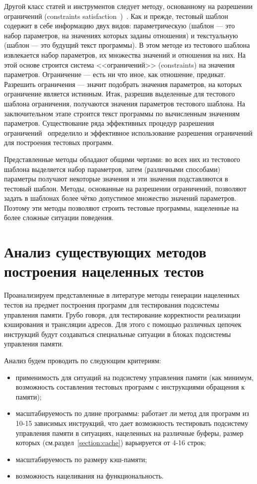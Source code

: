 
Другой класс статей и инструментов следует методу, основанному на разрешении ограничений (constraints satisfaction~\cite{CLPusingECLiPSe})~\cite{GenesysPro, GenesysPro2004Innovations, DeepTrans, RAVEN, MAATG}. Как и прежде, тестовый шаблон содержит в себе информацию двух видов: параметрическую (шаблон --- это набор параметров, на значениях которых заданы отношения) и текстуальную (шаблон --- это будущий текст программы). В этом методе из тестового шаблона извлекается набор параметров, их множества значений и отношения на них. На этой основе строится система <<ограничений>> (constraints) на значения параметров. Ограничение --- есть ни что иное, как отношение, предикат. Разрешить ограничения --- значит подобрать значения параметров, на которых ограничение является истинным. Итак, разрешив выделенные для тестового шаблона ограничения, получаются значения параметров тестового шаблона. На заключительном этапе строится текст программы по вычисленным значениям параметров. Существование ряда эффективных процедур разрешения ограничений~\cite{CLPusingECLiPSe, SMT} определило и эффективное использование разрешения ограничений для построения тестовых программ.

Представленные методы обладают общими чертами: во всех них из тестового шаблона выделяется набор параметров, затем (различными способами) параметры получают некоторые значения и эти значения подставляются в тестовый шаблон. Методы, основанные на разрешении ограничений, позволяют задать в шаблонах более чётко допустимое множество значений параметров. Поэтому эти методы позволяют строить тестовые программы, нацеленные на более сложные ситуации поведения.

\section{Анализ существующих методов построения нацеленных тестов}

Проанализируем представленные в литературе методы генерации нацеленных тестов на предмет построения программ для тестирования подсистемы управления памяти. Грубо говоря, для тестирование корректности реализации кэширования и трансляции адресов. Для этого с помощью различных цепочек инструкций будут создаваться специальные ситуации в блоках подсистемы управления памяти.

Анализ будем проводить по следующим критериям:
\begin{itemize}
	\item применимость для ситуаций на подсистему управления памяти (как минимум, возможность составления тестовых программ с инструкциями обращения к памяти);
	\item масштабируемость по длине программы: работает ли метод для программ из 10-15 зависимых инструкций, что дает возможность тестировать подсистему управления памяти в ситуациях, нацеленных на различные буферы, размер которых (см.раздел~\ref{section:cache}) варьируется от 4-16 строк;
	\item масштабируемость по размеру кэш-памяти;
	\item возможность нацеливания на функциональность.
\end{itemize}

